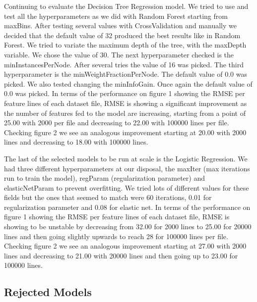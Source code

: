\par	Continuing to evaluate the Decision Tree Regression model. We tried to use and test all the hyperparameters as we did with Random Forest starting from maxBins. After testing several values with CrossValidation and manually we decided that the default value of 32 produced the best results like in Random Forest. We tried to variate the maximum depth of the tree, with the maxDepth variable. We chose the value of 30. The next hyperparameter checked is the minInstancesPerNode. After several tries the value of 16 was picked. The third hyperparameter is the minWeightFractionPerNode. The default value of 0.0 was picked. We also tested changing the minInfoGain. Once again the default value of 0.0 was picked. In terms of the performance on figure 1 showing the RMSE per feature lines of each dataset file, RMSE is showing a significant improvement as the number of features fed to the model are increasing, starting from a point of 25.00 with 2000 per file and decreasing to 22.00 with 100000 lines per file. Checking figure 2 we see an analogous improvement starting at 20.00 with 2000 lines and decreasing to 18.00 with 100000 lines.
\par	The last of the selected models to be run at scale is the Logistic Regression. We had three different hyperparameters at our disposal, the maxIter (max iterations run to train the model), regParam (regularization parameter) and elasticNetParam to prevent overfitting. We tried lots of different values for these fields but the ones that seemed to match were 60 iterations, 0.01 for regularization parameter and 0.08 for elastic net. In terms of the performance on figure 1 showing the RMSE per feature lines of each dataset file, RMSE is showing to be unstable by decreasing from 32.00 for 2000 lines to 25.00 for 20000 lines and then going slightly upwards to reach 28 for 100000 lines per file. Checking figure 2 we see an analogous improvement starting at 27.00 with 2000 lines and decreasing to 21.00 with 20000 lines and then going up to 23.00 for 100000 lines.




\subsection{Rejected Models}

